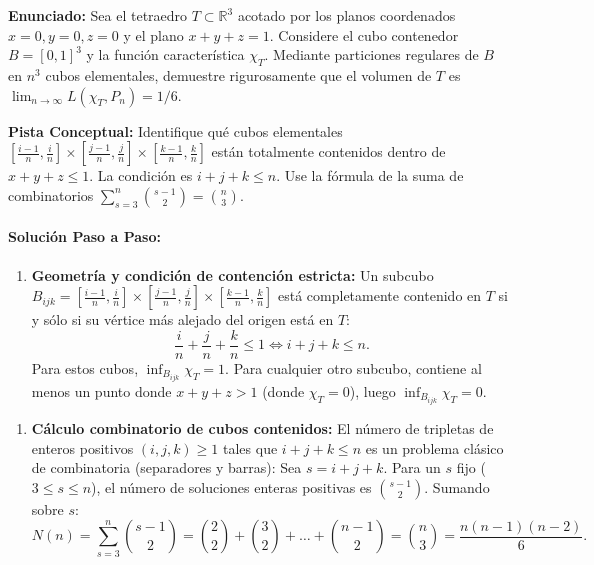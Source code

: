 \documentclass[11pt,a4paper]{article}
\begin{document}
\begin{tcolorbox}[colback=white,colframe=gray!40,arc=1mm,boxrule=0.5pt,left=3mm,right=3mm,top=2mm,bottom=2mm]
\textbf{Enunciado:} Sea el tetraedro $T \subset \mathbb{R}^3$ acotado por los planos coordenados $x=0, y=0, z=0$ y el plano $x + y + z = 1$. Considere el cubo contenedor $B = [0,1]^3$ y la función característica $\chi_T$. Mediante particiones regulares de $B$ en $n^3$ cubos elementales, demuestre rigurosamente que el volumen de $T$ es $\lim_{n\to\infty} L(\chi_T, P_n) = 1/6$.
\end{tcolorbox}

\begin{tcolorbox}[colback=yellow!4,colframe=accentamber!70,arc=1mm,boxrule=0.5pt,left=3mm,right=3mm,top=1.5mm,bottom=1.5mm]
\textbf{Pista Conceptual:} Identifique qué cubos elementales $[\frac{i-1}{n}, \frac{i}{n}] \times [\frac{j-1}{n}, \frac{j}{n}] \times [\frac{k-1}{n}, \frac{k}{n}]$ están totalmente contenidos dentro de $x+y+z \le 1$. La condición es $i + j + k \le n$. Use la fórmula de la suma de combinatorios $\sum_{s=3}^n \binom{s-1}{2} = \binom{n}{3}$.
\end{tcolorbox}

\paragraph{Solución Paso a Paso:}\par
\begin{enumerate}[label=\textbf{\arabic*.}]
\item \textbf{Geometría y condición de contención estricta:}
Un subcubo $B_{ijk} = [\frac{i-1}{n}, \frac{i}{n}] \times [\frac{j-1}{n}, \frac{j}{n}] \times [\frac{k-1}{n}, \frac{k}{n}]$ está completamente contenido en $T$ si y sólo si su vértice más alejado del origen está en $T$:
\begin{equation*}
\frac{i}{n} + \frac{j}{n} + \frac{k}{n} \le 1 \iff i + j + k \le n.
\end{equation*}
Para estos cubos, $\inf_{B_{ijk}} \chi_T = 1$.
Para cualquier otro subcubo, contiene al menos un punto donde $x+y+z > 1$ (donde $\chi_T = 0$), luego $\inf_{B_{ijk}} \chi_T = 0$.
\end{enumerate}

\begin{enumerate}[label=\textbf{\arabic*.}]
\item \textbf{Cálculo combinatorio de cubos contenidos:}
El número de tripletas de enteros positivos $(i, j, k) \ge 1$ tales que $i + j + k \le n$ es un problema clásico de combinatoria (separadores y barras):
Sea $s = i + j + k$. Para un $s$ fijo ($3 \le s \le n$), el número de soluciones enteras positivas es $\binom{s-1}{2}$.
Sumando sobre $s$:
\begin{equation*}
N(n) = \sum_{s=3}^n \binom{s-1}{2} = \binom{2}{2} + \binom{3}{2} + \dots + \binom{n-1}{2} = \binom{n}{3} = \frac{n(n-1)(n-2)}{6}.
\end{equation*}
\end{enumerate}
\end{document}
